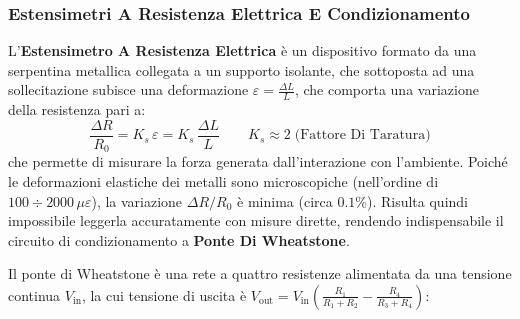 ﻿\documentclass[11pt, a4paper]{article}
\begin{document}
\subsubsection{Estensimetri A Resistenza Elettrica E Condizionamento}
L'\textbf{Estensimetro A Resistenza Elettrica} è un dispositivo formato da una serpentina metallica collegata a un supporto isolante, che sottoposta ad una sollecitazione subisce una deformazione $\varepsilon = \frac{\Delta L}{L}$, che comporta una variazione della resistenza pari a:
\[
    \frac{\Delta R}{R_0} = K_{s} \, \varepsilon = K_{s} \, \frac{\Delta L}{L} \qquad K_{s} \approx 2 \; \text{(Fattore Di Taratura)}
\]
che permette di misurare la forza generata dall'interazione con l'ambiente. Poiché le deformazioni elastiche dei metalli sono microscopiche (nell'ordine di $100\div2000\,\mu\varepsilon$), la variazione $\Delta R / R_0$ è minima (circa $0.1\%$). Risulta quindi impossibile leggerla accuratamente con misure dirette, rendendo indispensabile il circuito di condizionamento a \textbf{Ponte Di Wheatstone}.

Il ponte di Wheatstone è una rete a quattro resistenze alimentata da una tensione continua $V_{\text{in}}$, la cui tensione di uscita è $V_{\text{out}} = V_{\text{in}} \left( \frac{R_1}{R_1 + R_2} - \frac{R_4}{R_3 + R_4} \right)$:
\end{document}
